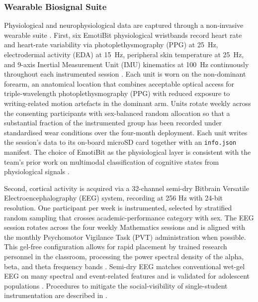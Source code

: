 \subsubsection{Wearable Biosignal Suite}

Physiological and neurophysiological data are captured through a non-invasive wearable suite \parencite{hong_advances_2025,HernandezMustieles2024_wearable_education}. First, six EmotiBit physiological wristbands record heart rate and heart-rate variability via photoplethysmography (PPG) at 25~Hz, electrodermal activity (EDA) at 15~Hz, peripheral skin temperature at 25~Hz, and 9-axis Inertial Measurement Unit (IMU) kinematics at 100~Hz continuously throughout each instrumented session \parencite{di_lascio_unobtrusive_2018, astudillo_capturing_2023}. Each unit is worn on the non-dominant forearm, an anatomical location that combines acceptable optical access for triple-wavelength photoplethysmography (PPG) with reduced exposure to writing-related motion artefacts in the dominant arm. Units rotate weekly across the consenting participants with sex-balanced random allocation so that a substantial fraction of the instrumented group has been recorded under standardised wear conditions over the four-month deployment. Each unit writes the session’s data to its on-board microSD card together with an \texttt{info.json} manifest. The choice of EmotiBit as the physiological layer is consistent with the team’s prior work on multimodal classification of cognitive states from physiological signals \parencite{SanchezReolid2024_eeg_fnirs}. 

Second, cortical activity is acquired via a 32-channel semi-dry Bitbrain Versatile Electroencephalography (EEG) system, recording at 256 Hz with 24-bit resolution. One participant per week is instrumented, selected by stratified random sampling that crosses academic-performance category with sex. The EEG session rotates across the four weekly Mathematics sessions and is aligned with the monthly Psychomotor Vigilance Task (PVT) administration when possible. This gel-free configuration allows for rapid placement by trained research personnel in the classroom, processing the power spectral density of the alpha, beta, and theta frequency bands \parencite{ramirez-moreno_eeg-based_2021, apicella_eeg-based_2022}. Semi-dry EEG matches conventional wet-gel EEG on many spectral and event-related features and is validated for adolescent populations \parencite{LopezGordo2014_dry_eeg,DiFlumeri2019_dry_eeg_validation,Hinrichs2020_motion_artifacts,LauZhu2019_mobile_eeg_review}. Procedures to mitigate the social-visibility of single-student instrumentation are described in .

